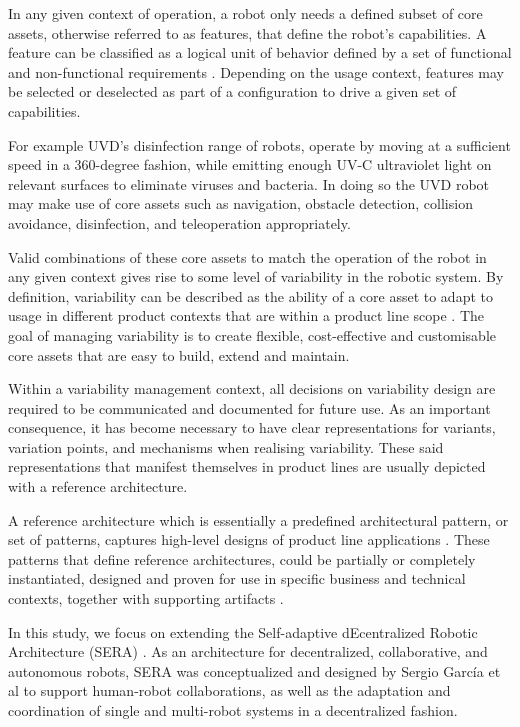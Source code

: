 \documentclass[conference]{IEEEtran}
\begin{document}
In any given context of operation, a robot only needs a defined subset of core assets, otherwise referred to as features, that define the robot's capabilities. A feature can be classified as a logical unit of behavior defined by a set of functional and non-functional requirements \cite{feats}. Depending on the usage context, features may be selected or deselected as part of a configuration to drive a given set of capabilities. 

For example UVD's disinfection range of robots, operate by moving at a sufficient speed in a 360-degree fashion, while emitting enough UV-C ultraviolet light on relevant surfaces to eliminate viruses and bacteria. In doing so the UVD robot may make use of core assets such as navigation, obstacle detection, collision avoidance, disinfection, and teleoperation appropriately.

Valid combinations of these core assets to match the operation of the robot in any given context gives rise to some level of variability in the robotic system. By definition, variability can be described as the ability of a core asset to adapt to usage in different product contexts that are within a product line scope \cite{variab}. The goal of managing variability is to create flexible, cost-effective and customisable core assets that are easy to build, extend and maintain.

Within a variability management context, all decisions on variability design are required to be communicated and documented for future use. As an important consequence, it has become necessary to have clear representations for variants, variation points, and mechanisms when realising variability. These said representations that manifest themselves in product lines are usually depicted with a reference architecture.

A reference architecture which is essentially a predefined architectural pattern, or set of patterns, captures high-level designs of product line applications \cite{sple}. These patterns that define reference architectures, could be partially or completely instantiated, designed and proven for use in specific business and technical contexts, together with supporting artifacts \cite{ref-arch}.

In this study, we focus on extending the Self-adaptive dEcentralized Robotic Architecture (SERA) \cite{sera}. As an architecture for decentralized, collaborative, and autonomous robots, SERA was conceptualized and designed by Sergio Garc\'{i}a et al to support human-robot collaborations, as well as the adaptation and coordination of single and multi-robot systems in a decentralized fashion.
\end{document}
